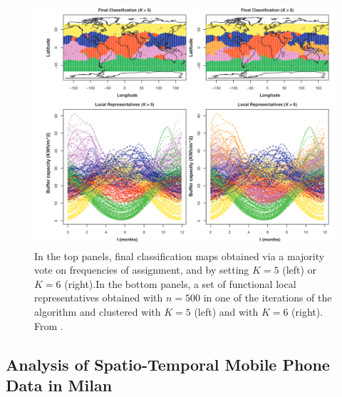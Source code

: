 \begin{figure}
    \centering
    \includegraphics[scale=0.4]{Images/resbagging.png}
    \caption[Classification of irradiance data.]{In the top panels, final classification maps obtained via a majority vote on frequencies of assignment, and by setting $K = 5$ (left) or $K = 6$ (right).In the bottom panels, a set of functional local representatives obtained with $n = 500$ in one of the iterations of the algorithm and clustered with $K = 5$ (left) and with $K=6$ (right). From \citeauthor{secchi_bagging_2013} \citeyear{secchi_bagging_2013}.}
    \label{fig:resbagging}
\end{figure}






\subsection{Analysis of Spatio-Temporal Mobile Phone Data in Milan}
\label{subsec:mobilephonemilan}
